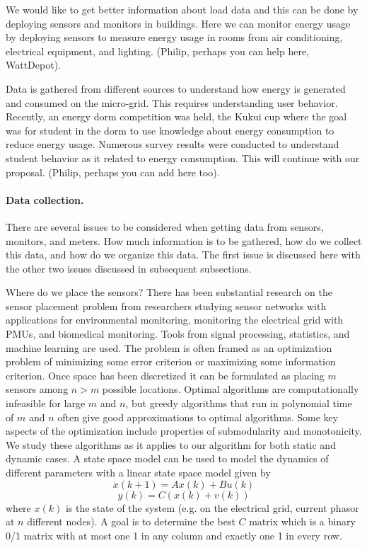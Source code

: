 We would like to get better information about load data and this can be
done by deploying sensors and monitors in buildings.  Here we can monitor
energy usage by deploying sensors to measure energy usage in rooms from air
conditioning, electrical equipment, and lighting.  (Philip, perhaps you can
help here, WattDepot).
 
Data is gathered from different sources to understand how energy is
generated and consumed on the micro-grid.  This requires understanding user
behavior.  Recently, an energy dorm competition was held, the Kukui cup
where the goal was for student in the dorm to use knowledge about energy
consumption to reduce energy usage.  Numerous survey results were conducted
to understand student behavior as it related to energy consumption.  This
will continue with our proposal.  (Philip, perhaps you can add here too).
 
\paragraph{Data collection.}

There are several issues to be considered when getting data from sensors, monitors, and meters.
How much information is to be gathered, how do we collect this data, and how do we organize
this data.  The first issue is discussed here with the other two issues discussed in subsequent
subsections.

Where do we place the sensors?  There has been substantial research on the sensor placement
problem from researchers studying sensor networks with applications for environmental
monitoring, monitoring the electrical grid with PMUs, and biomedical monitoring.  Tools from
signal processing, statistics, and machine learning are used.  The problem is often
framed as an optimization problem of minimizing some error criterion or maximizing some
information criterion.    Once space has been discretized it can be formulated as placing
$m$ sensors among $n>m$ possible locations.  Optimal algorithms are computationally
infeasible for large $m$ and $n$, but greedy algorithms that run in polynomial time of $m$
and $n$ often give good approximations to optimal algorithms.   Some key aspects of the
optimization include properties of submodularity and monotonicity.    We study these algorithms
as it applies to our algorithm for both static and dynamic cases.    A state space model can
be used to model the dynamics of different parameters with a linear state space model given
by 
\begin{displaymath}
x(k+1) = A x(k) + B u(k)
\end{displaymath}
\begin{displaymath}
y(k) = C (x(k) + v(k))
\end{displaymath}
where $x(k)$ is the state of the system (e.g. on the electrical grid, current phasor at $n$ different
nodes).  A goal is to determine the best $C$ matrix which is a binary 0/1 matrix with at most one
1 in any column and exactly one 1 in every row.

